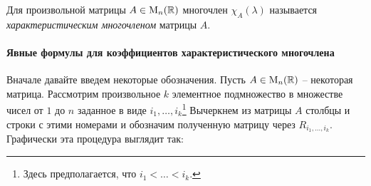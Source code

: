 Для произвольной матрицы $A\in\operatorname{M}_{n}(\mathbb R)$ многочлен $\chi_A(\lambda)$ называется {\it характеристическим многочленом} матрицы $A$.

\paragraph{Явные формулы для коэффициентов характеристического многочлена}

Вначале давайте введем некоторые обозначения. Пусть $A\in\operatorname{M}_{n}(\mathbb R)$ -- некоторая матрица. Рассмотрим произвольное $k$ элементное подмножество в множестве чисел от $1$ до $n$ заданное в виде $i_1,\ldots, i_k$\footnote{Здесь предполагается, что $i_1 < \ldots < i_k$.} Вычеркнем из матрицы $A$ столбцы и строки с этими номерами и обозначим полученную матрицу через $R_{i_1,\ldots,i_k}$. Графически эта процедура выглядит так:
